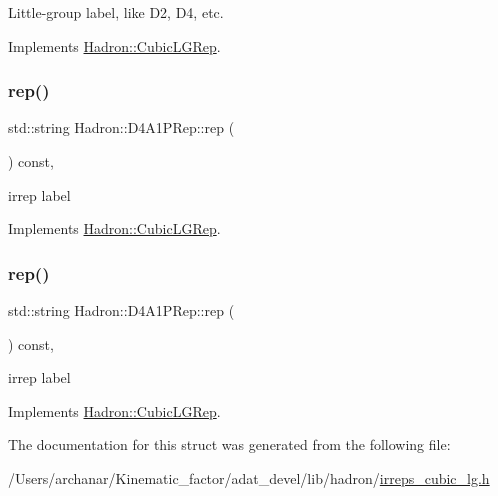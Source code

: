 Little-\/group label, like D2, D4, etc. 

Implements \mbox{\hyperlink{structHadron_1_1CubicLGRep_a9bdb14b519a611d21379ed96a3a9eb41}{Hadron\+::\+Cubic\+L\+G\+Rep}}.

\mbox{\label{structHadron_1_1D4A1PRep_ab4f311aa3268628a8380e1e73c6023a1}} 
\subsubsection{\texorpdfstring{rep()}{rep()}\hspace{0.1cm}{\footnotesize\ttfamily [1/2]}}
{\footnotesize\ttfamily std\+::string Hadron\+::\+D4\+A1\+P\+Rep\+::rep (\begin{DoxyParamCaption}{ }\end{DoxyParamCaption}) const\hspace{0.3cm}{\ttfamily [inline]}, {\ttfamily [virtual]}}

irrep label 

Implements \mbox{\hyperlink{structHadron_1_1CubicLGRep_a50f5ddbb8f4be4cee0106fa9e8c75e6c}{Hadron\+::\+Cubic\+L\+G\+Rep}}.

\mbox{\label{structHadron_1_1D4A1PRep_ab4f311aa3268628a8380e1e73c6023a1}} 
\subsubsection{\texorpdfstring{rep()}{rep()}\hspace{0.1cm}{\footnotesize\ttfamily [2/2]}}
{\footnotesize\ttfamily std\+::string Hadron\+::\+D4\+A1\+P\+Rep\+::rep (\begin{DoxyParamCaption}{ }\end{DoxyParamCaption}) const\hspace{0.3cm}{\ttfamily [inline]}, {\ttfamily [virtual]}}

irrep label 

Implements \mbox{\hyperlink{structHadron_1_1CubicLGRep_a50f5ddbb8f4be4cee0106fa9e8c75e6c}{Hadron\+::\+Cubic\+L\+G\+Rep}}.



The documentation for this struct was generated from the following file\+:\begin{DoxyCompactItemize}
\item 
/\+Users/archanar/\+Kinematic\+\_\+factor/adat\+\_\+devel/lib/hadron/\mbox{\hyperlink{lib_2hadron_2irreps__cubic__lg_8h}{irreps\+\_\+cubic\+\_\+lg.\+h}}\end{DoxyCompactItemize}
